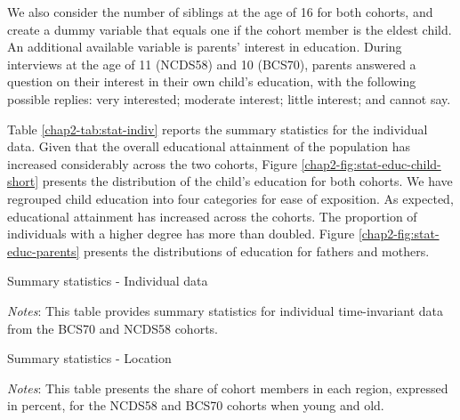 We also consider the number of siblings at the age of 16 for both cohorts, and create a dummy variable that equals one if the cohort member is the eldest child. An additional available variable is parents' interest in education. During interviews at the age of 11 (NCDS58) and 10 (BCS70), parents answered a question on their interest in their own child's education, with the following possible replies: very interested; moderate interest; little interest; and cannot say.

Table \ref{chap2-tab:stat-indiv} reports the summary statistics for the individual data. Given that the overall educational attainment of the population has increased considerably across the two cohorts, Figure \ref{chap2-fig:stat-educ-child-short} presents the distribution of the child's education for both cohorts. We have regrouped child education into four categories for ease of exposition. As expected, educational attainment has increased across the cohorts. The proportion of individuals with a higher degree has more than doubled. Figure \ref{chap2-fig:stat-educ-parents} presents the distributions of education for fathers and mothers.

\begin{table}[!htb]
    \centering
    \caption{Summary statistics - Individual data}
    \label{chap2-tab:stat-indiv}
    \begin{threeparttable}
        \setlength{\tabcolsep}{3pt}
        
        \begin{tablenotes}[flushleft]
            \footnotesize{\item \textit{Notes}: This table provides summary statistics for individual time-invariant data from the BCS70 and NCDS58 cohorts.}
        \end{tablenotes}
    \end{threeparttable}
\end{table}


\begin{table}[!htb]
    \centering
    \caption{Summary statistics - Location}
    \label{chap2-tab:stat-location}
    \begin{threeparttable}
        \setlength{\tabcolsep}{18pt}
        
        \begin{tablenotes}[flushleft]
            \footnotesize{\item \textit{Notes}: This table presents the share of cohort members in each region, expressed in percent, for the NCDS58 and BCS70 cohorts when young and old.}
        \end{tablenotes}
    \end{threeparttable}
\end{table}

